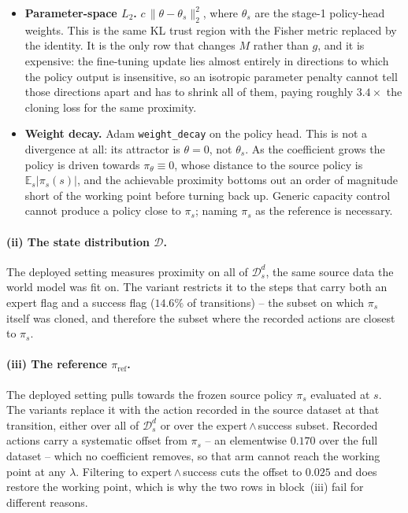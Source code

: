 \begin{itemize}
      rules out tail shape as the causal channel.
\item \textbf{Parameter-space $L_2$.} $c\,\lVert\theta-\theta_s\rVert_2^2$,
      where $\theta_s$ are the stage-1 policy-head weights. This is the same KL
      trust region with the Fisher metric replaced by the identity. It is the
      only row that changes $M$ rather than $g$, and it is expensive: the
      fine-tuning update lies almost entirely in directions to which the policy
      output is insensitive, so an isotropic parameter penalty cannot tell those
      directions apart and has to shrink all of them, paying roughly
      $3.4\times$ the cloning loss for the same proximity.
\item \textbf{Weight decay.} Adam \texttt{weight\_decay} on the policy head.
      This is not a divergence at all: its attractor is $\theta=0$, not
      $\theta_s$. As the coefficient grows the policy is driven towards
      $\pi_\theta\equiv 0$, whose distance to the source policy is
      $\mathbb{E}_s\lvert\pi_s(s)\rvert$, and the achievable proximity bottoms
      out an order of magnitude short of the working point before turning back
      up. Generic capacity control cannot produce a policy close to $\pi_s$;
      naming $\pi_s$ as the reference is necessary.
\end{itemize}

\paragraph{(ii) The state distribution $\mathcal{D}$.}
The deployed setting measures proximity on all of $\mathcal{D}^d_s$, the same
source data the world model was fit on. The variant restricts it to the steps
that carry both an expert flag and a success flag ($14.6\%$ of transitions) --
the subset on which $\pi_s$ itself was cloned, and therefore the subset where
the recorded actions are closest to $\pi_s$.

\paragraph{(iii) The reference $\pi_{\mathrm{ref}}$.}
The deployed setting pulls towards the frozen source policy $\pi_s$ evaluated at
$s$. The variants replace it with the action recorded in the source dataset at
that transition, either over all of $\mathcal{D}^d_s$ or over the
expert\,$\wedge$\,success subset. Recorded actions carry a systematic offset
from $\pi_s$ -- an elementwise $0.170$ over the full dataset -- which no
coefficient removes, so that arm cannot reach the working point at any
$\lambda$. Filtering to expert\,$\wedge$\,success cuts the offset to $0.025$ and
does restore the working point, which is why the two rows in block~(iii) fail
for different reasons.

